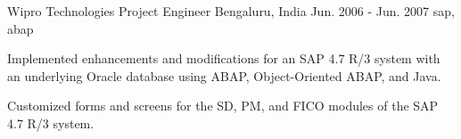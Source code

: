\cventry
    {Wipro Technologies} %
    {Project Engineer} %
    {Bengaluru, India} %
    {Jun. 2006 - Jun. 2007} %
    { sap, abap } %
    {
    \begin{cvitems} %
        \item {Implemented enhancements and modifications for an SAP 4.7 R/3 system with an underlying Oracle database using ABAP, Object-Oriented ABAP, and Java.}
        \item {Customized forms and screens for the SD, PM, and FICO modules of the SAP 4.7 R/3 system.}
    \end{cvitems}
    }